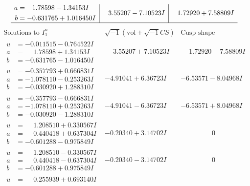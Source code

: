 \documentclass[1p]{elsarticle_modified}
\theoremstyle{definition}
\newcommand{\I}{\sqrt{-1}}
\begin{document}
$$\begin{array}{c|c|c}
\begin{aligned}
a &= \phantom{-}1.78598 - 1.34153 I \\
b &= -0.631765 + 1.016450 I\end{aligned}
 & \phantom{-}3.55207 - 7.10523 I & \phantom{-}1.72920 + 7.58809 I\\
 \hline 
 \end{array}$$\newpage$$\begin{array}{c|c|c}  
\text{Solutions to }I^u_{1}& \I (\text{vol} + \sqrt{-1}CS) & \text{Cusp shape}\\
 \hline 
\begin{aligned}
u &= -0.011515 - 0.764522 I \\
a &= \phantom{-}1.78598 + 1.34153 I \\
b &= -0.631765 - 1.016450 I\end{aligned}
 & \phantom{-}3.55207 + 7.10523 I & \phantom{-}1.72920 - 7.58809 I \\ \hline\begin{aligned}
u &= -0.357793 + 0.666831 I \\
a &= -1.078110 - 0.253263 I \\
b &= -0.030920 + 1.288310 I\end{aligned}
 & -4.91041 + 6.36723 I & -6.53571 - 8.04968 I \\ \hline\begin{aligned}
u &= -0.357793 - 0.666831 I \\
a &= -1.078110 + 0.253263 I \\
b &= -0.030920 - 1.288310 I\end{aligned}
 & -4.91041 - 6.36723 I & -6.53571 + 8.04968 I \\ \hline\begin{aligned}
u &= \phantom{-}1.208510 + 0.330567 I \\
a &= \phantom{-}0.440418 + 0.637304 I \\
b &= -0.601288 - 0.975849 I\end{aligned}
 & -0.20340 + 3.14702 I & \phantom{-0.000000 } 0 \\ \hline\begin{aligned}
u &= \phantom{-}1.208510 - 0.330567 I \\
a &= \phantom{-}0.440418 - 0.637304 I \\
b &= -0.601288 + 0.975849 I\end{aligned}
 & -0.20340 - 3.14702 I & \phantom{-0.000000 } 0 \\ \hline\begin{aligned}
u &= \phantom{-}0.255939 + 0.693140 I \\

\end{aligned}
\end{array}$$
\end{document}
